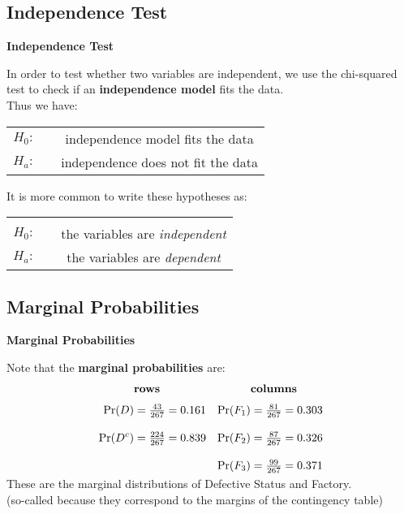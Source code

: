 \documentclass[compress]{beamer}        %
\makeatletter
\newcommand{\tcb}{\textcolor{beamer@blendedblue}}
\makeatother
\begin{document}
\subsection{Independence Test}
\begin{frame}{\bf \tcb{Independence Test}}

In order to test whether two variables are independent, we use the chi-squared test to check if an {\bf independence model} fits the data.\\[0.8cm]

Thus we have:

\begin{center}
\begin{tabular}{c@{\,\,}c}
$H_0: \quad$ & independence model fits the data\\[0.2cm]
$H_a: \quad$ & independence does not fit the data\\[0.6cm]
\end{tabular}
\end{center}

It is more common to write these hypotheses as:

\begin{center}
\begin{tabular}{|c@{\,\,}c|}
\hline
&\\[-0.4cm]
$H_0: \quad$ &  the variables are \emph{independent} \\[0.2cm]
$H_a: \quad$ & the variables are \emph{dependent} \\[0.1cm]
\hline
\end{tabular}
\end{center}

\end{frame}




\subsection{Marginal Probabilities}
\begin{frame}{\bf \tcb{Marginal Probabilities}}

Note that the {\bf marginal probabilities} are:\\[-0.1cm]
\begin{align*}
&\text{\bf rows}                      &          & \text{\bf columns} \\[0.1cm]
\Pr(D) &= \tfrac{43}{267} = 0.161 & \Pr(F_1) &= \tfrac{81}{267} = 0.303\\[0.3cm]
\Pr(D^c) &= \tfrac{224}{267} = 0.839 & \Pr(F_2) &= \tfrac{87}{267} = 0.326 \\[0.3cm]
&&\Pr(F_3) &= \tfrac{99}{267} = 0.371
\\[-0.3cm]
\end{align*}

These are the marginal distributions of Defective Status and Factory.\\[0.3cm]

{\footnotesize(so-called because they correspond to the margins of the contingency table)}
\end{frame}
\end{document}
